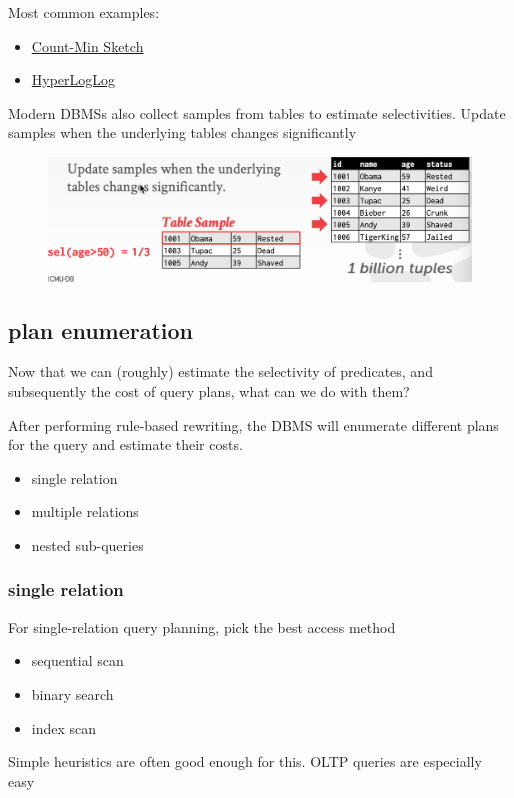 \documentclass[11pt]{article}
\begin{document}
Most common examples:
\begin{itemize}
\item \uline{Count-Min Sketch}
\item \uline{HyperLogLog}
\end{itemize}


Modern DBMSs also collect samples from tables to estimate selectivities. Update samples when the
underlying tables changes significantly
\begin{figure}[htbp]
\centering
\includegraphics[width=.7\textwidth]{../images/15445/45.png}
\label{}
\end{figure}

\subsection{plan enumeration}
\label{sec:org47252e9}
Now that we can (roughly) estimate the selectivity of predicates, and subsequently the cost of
query plans, what can we do with them?

After performing rule-based rewriting, the DBMS will enumerate different plans for the query and
estimate their costs.
\begin{itemize}
\item single relation
\item multiple relations
\item nested sub-queries
\end{itemize}
\subsubsection{single relation}
\label{sec:org9fecd68}
For single-relation query planning, pick the best access method
\begin{itemize}
\item sequential scan
\item binary search
\item index scan
\end{itemize}
Simple heuristics are often good enough for this. OLTP queries are especially easy
\end{document}
